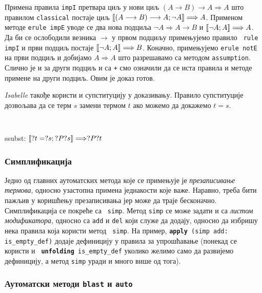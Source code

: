 Примена правила {\tt impI} претвара циљ у нови циљ $(A \longrightarrow
B) \longrightarrow A \Longrightarrow A$ што правилом {\tt classical}
постаје циљ $\llbracket (A \longrightarrow B) \longrightarrow A; \neg A
\rrbracket \Longrightarrow A$. Применом методе {\tt erule impE} уводе се
два нова подциља $\neg A \Longrightarrow A \longrightarrow B$ и
$\llbracket \neg A; A \rrbracket \Longrightarrow A$. Да би се ослободили
везника $\longrightarrow$ у првом подциљу примењујемо правило {\tt
  rule impI} и први подциљ постаје $\llbracket \neg A; A \rrbracket
\Longrightarrow B$. Коначно, примењујемо {\tt erule notE} на први
подциљ и добијамо $ A \Longrightarrow A$ што разрешавамо са методом
{\tt assumption}. Слично је и за други подциљ и са {\tt +} смо
означили да се иста правила и методе примене на други подциљ. Овим је
доказ готов.

\emph{Isabelle} такође користи и супституцију у доказивању. Правило
супституције дозвољава да се терм $s$ замени термом $t$ ако можемо да
докажемо $t = s$.

\begin{small}
{\tt 
\begin{tabbing}
ssubst: $\llbracket ?t = ?s ; ?P ?s \rrbracket \Longrightarrow ?P ?t$
\end{tabbing}
}
\end{small}

\subsubsection{Симплификација}

Једно од главних аутоматских метода које се примењује је
\emph{презаписивање термова}, односно узастопна примена једнакости
које важе. Наравно, треба бити пажљив у коришћењу презаписивања јер
може да траје бесконачно. Симплификација се покреће са {\tt
  simp}. Метод {\tt simp} се може задати и са \emph{листом
  модификатора}, односно са {\tt add} и {\tt del} који служе да
додају, односно да избришу нека правила која користи метод {\tt
  simp}. На пример, {\tt \textbf{apply} (simp add: is\_empty\_def)}
додаје дефиницију у правила за упрошћавање (понекад се користи и {\tt
  \textbf{unfolding} is\_empty\_def} уколико желимо само да развијемо
дефиницију, а метод {\tt simp} уради и много више од тога).

\subsubsection{Аутоматски методи {\tt blast} и {\tt auto}}


